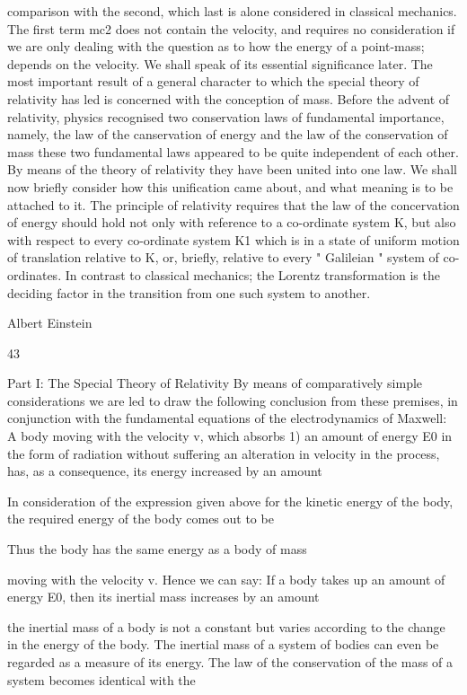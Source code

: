 \documentclass{article}
\begin{document}
comparison with the second,
which last is alone considered in classical mechanics. The first term mc2 does not contain
the velocity, and requires no consideration if we are only dealing with the question as to
how the energy of a point-mass; depends on the velocity. We shall speak of its essential
significance later.
The most important result of a general character to which the special theory of relativity
has led is concerned with the conception of mass. Before the advent of relativity, physics
recognised two conservation laws of fundamental importance, namely, the law of the
canservation of energy and the law of the conservation of mass these two fundamental laws
appeared to be quite independent of each other. By means of the theory of relativity they
have been united into one law. We shall now briefly consider how this unification came
about, and what meaning is to be attached to it.
The principle of relativity requires that the law of the concervation of energy should hold
not only with reference to a co-ordinate system K, but also with respect to every co-ordinate
system K1 which is in a state of uniform motion of translation relative to K, or, briefly,
relative to every " Galileian " system of co-ordinates. In contrast to classical mechanics; the
Lorentz transformation is the deciding factor in the transition from one such system to
another.

Albert Einstein

43

Part I: The Special Theory of Relativity
By means of comparatively simple considerations we are led to draw the following
conclusion from these premises, in conjunction with the fundamental equations of the
electrodynamics of Maxwell: A body moving with the velocity v, which absorbs 1) an
amount of energy E0 in the form of radiation without suffering an alteration in velocity in
the process, has, as a consequence, its energy increased by an amount

In consideration of the expression given above for the kinetic energy of the body, the
required energy of the body comes out to be

Thus the body has the same energy as a body of mass

moving with the velocity v. Hence we can say: If a body takes up an amount of energy E0,
then its inertial mass increases by an amount

the inertial mass of a body is not a constant but varies according to the change in the energy
of the body. The inertial mass of a system of bodies can even be regarded as a measure of
its energy. The law of the conservation of the mass of a system becomes identical with the
\end{document}
